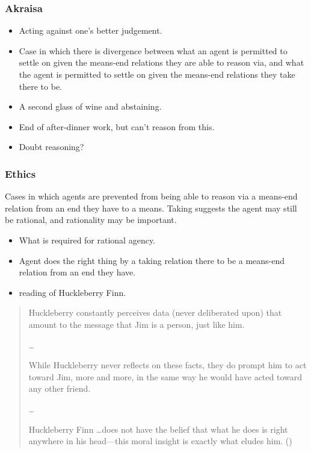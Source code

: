 \documentclass[10pt]{article}
\newcommand{\schemaName}[1]{\textsf{#1}}
\begin{document}
\subsubsection{Akraisa}
\label{sec:akraisa}

 \begin{itemize}
  \item Acting against one's better judgement.
  \item Case in which there is divergence between what an agent is permitted to settle on given the means-end relations they are able to reason via, and what the agent is permitted to settle on given the means-end relations they take there to be.
  \item A second glass of wine and abstaining.
  \item End of after-dinner work, but can't reason from this.
  \item Doubt reasoning?
  \end{itemize}

\subsubsection{Ethics}
\label{sec:ethics}

Cases in which agents are prevented from being able to reason via a means-end relation from an end they have to a means.
\schemaName{Taking} suggests the agent may still be rational, and rationality may be important.

  \begin{itemize}
  \item What is required for rational agency.
  \item Agent does the right thing by a taking relation there to be a means-end relation from an end they have.
  \item \citeauthor{Arpaly:2003aa} reading of Huckleberry Finn.
  \end{itemize}

  \begin{quote}
    Huckleberry constantly perceives data (never deliberated upon) that amount to the message that Jim is a person, just like him.

    \dots

    While Huckleberry never reflects on these facts, they do prompt him to act toward Jim, more and more, in the same way he would have acted toward any other friend.

    \dots

    Huckleberry Finn \dots\space does not have the belief that what he does is right anywhere in his head---this moral insight is exactly what eludes him.\nolinebreak
    \mbox{}\hfill\mbox{(\citeyear[77]{Arpaly:2003aa})}
  \end{quote}
\end{document}

